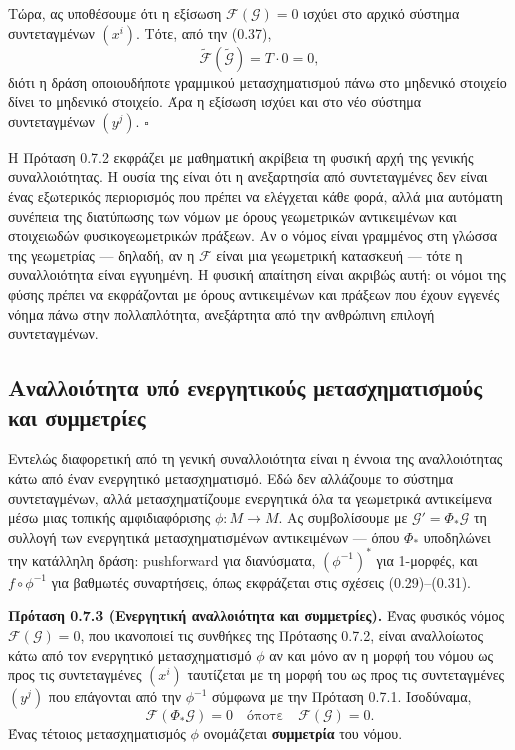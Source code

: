 \documentclass[12pt]{article}
\begin{document}
Τώρα, ας υποθέσουμε ότι η εξίσωση $\mathcal{F}(\mathcal{G}) = 0$ ισχύει στο αρχικό σύστημα συντεταγμένων $(x^i)$. Τότε, από την (0.37),
\[
\tilde{\mathcal{F}}(\tilde{\mathcal{G}}) = T \cdot 0 = 0,
\]
διότι η δράση οποιουδήποτε γραμμικού μετασχηματισμού πάνω στο μηδενικό στοιχείο δίνει το μηδενικό στοιχείο. Άρα η εξίσωση ισχύει και στο νέο σύστημα συντεταγμένων $(y^j)$. $\square$

Η Πρόταση 0.7.2 εκφράζει με μαθηματική ακρίβεια τη φυσική αρχή της γενικής συναλλοιότητας. Η ουσία της είναι ότι η ανεξαρτησία από συντεταγμένες δεν είναι ένας εξωτερικός περιορισμός που πρέπει να ελέγχεται κάθε φορά, αλλά μια αυτόματη συνέπεια της διατύπωσης των νόμων με όρους γεωμετρικών αντικειμένων και στοιχειωδών φυσικογεωμετρικών πράξεων. Αν ο νόμος είναι γραμμένος στη γλώσσα της γεωμετρίας — δηλαδή, αν η $\mathcal{F}$ είναι μια γεωμετρική κατασκευή — τότε η συναλλοιότητα είναι εγγυημένη. Η φυσική απαίτηση είναι ακριβώς αυτή: οι νόμοι της φύσης πρέπει να εκφράζονται με όρους αντικειμένων και πράξεων που έχουν εγγενές νόημα πάνω στην πολλαπλότητα, ανεξάρτητα από την ανθρώπινη επιλογή συντεταγμένων.

\subsection{Αναλλοιότητα υπό ενεργητικούς μετασχηματισμούς και συμμετρίες}

Εντελώς διαφορετική από τη γενική συναλλοιότητα είναι η έννοια της αναλλοιότητας κάτω από έναν ενεργητικό μετασχηματισμό. Εδώ δεν αλλάζουμε το σύστημα συντεταγμένων, αλλά μετασχηματίζουμε ενεργητικά όλα τα γεωμετρικά αντικείμενα μέσω μιας τοπικής αμφιδιαφόρισης $\phi: M \to M$. Ας συμβολίσουμε με $\mathcal{G}' = \Phi_* \mathcal{G}$ τη συλλογή των ενεργητικά μετασχηματισμένων αντικειμένων — όπου $\Phi_*$ υποδηλώνει την κατάλληλη δράση: pushforward για διανύσματα, $(\phi^{-1})^*$ για 1-μορφές, και $f \circ \phi^{-1}$ για βαθμωτές συναρτήσεις, όπως εκφράζεται στις σχέσεις (0.29)–(0.31).

\textbf{Πρόταση 0.7.3 (Ενεργητική αναλλοιότητα και συμμετρίες).}
Ένας φυσικός νόμος $\mathcal{F}(\mathcal{G}) = 0$, που ικανοποιεί τις συνθήκες της Πρότασης 0.7.2, είναι αναλλοίωτος κάτω από τον ενεργητικό μετασχηματισμό $\phi$ αν και μόνο αν η μορφή του νόμου ως προς τις συντεταγμένες $(x^i)$ ταυτίζεται με τη μορφή του ως προς τις συντεταγμένες $(y^j)$ που επάγονται από την $\phi^{-1}$ σύμφωνα με την Πρόταση 0.7.1. Ισοδύναμα,
\[
\mathcal{F}(\Phi_* \mathcal{G}) = 0 \quad \text{όποτε} \quad \mathcal{F}(\mathcal{G}) = 0.
\]
Ένας τέτοιος μετασχηματισμός $\phi$ ονομάζεται \textbf{συμμετρία} του νόμου.
\end{document}

